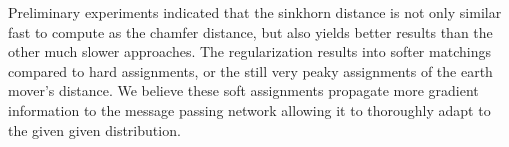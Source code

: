 Preliminary experiments indicated that the sinkhorn distance is not only similar fast to compute as the chamfer distance, but also yields better results than the other much slower approaches. The regularization results into softer matchings compared to hard assignments, or the still very peaky assignments of the earth mover's distance. We believe these soft assignments propagate more gradient information to the message passing network allowing it to thoroughly adapt to the given given distribution.

